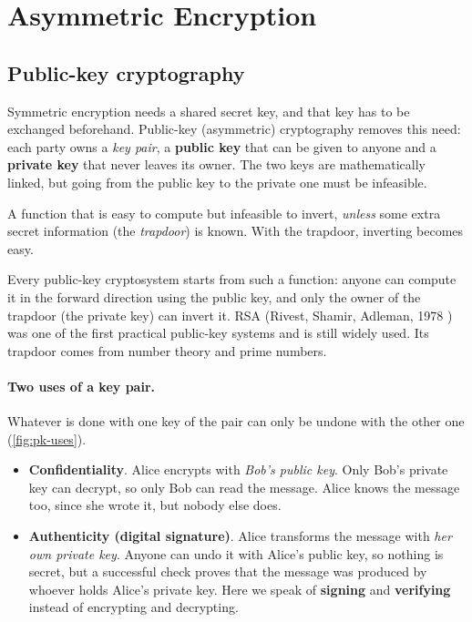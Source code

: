 \section{Asymmetric Encryption}
\label{sec:asymmetric}

\subsection{Public-key cryptography}

Symmetric encryption needs a shared secret key, and that key has to be exchanged beforehand. Public-key (asymmetric) cryptography removes this need: each party owns a \emph{key pair}, a \textbf{public key} that can be given to anyone and a \textbf{private key} that never leaves its owner. The two keys are mathematically linked, but going from the public key to the private one must be infeasible.

\begin{definition}
A function that is easy to compute but infeasible to invert, \emph{unless} some extra secret information (the \emph{trapdoor}) is known. With the trapdoor, inverting becomes easy.
\end{definition}

Every public-key cryptosystem starts from such a function: anyone can compute it in the forward direction using the public key, and only the owner of the trapdoor (the private key) can invert it. RSA (Rivest, Shamir, Adleman, 1978 \cite{rsa1978}) was one of the first practical public-key systems and is still widely used. Its trapdoor comes from number theory and prime numbers.

\paragraph{Two uses of a key pair.} Whatever is done with one key of the pair can only be undone with the other one (\cref{fig:pk-uses}).
\begin{itemize}
    \item \textbf{Confidentiality}. Alice encrypts with \emph{Bob's public key}. Only Bob's private key can decrypt, so only Bob can read the message. Alice knows the message too, since she wrote it, but nobody else does.
    \item \textbf{Authenticity (digital signature)}. Alice transforms the message with \emph{her own private key}. Anyone can undo it with Alice's public key, so nothing is secret, but a successful check proves that the message was produced by whoever holds Alice's private key. Here we speak of \textbf{signing} and \textbf{verifying} instead of encrypting and decrypting.
\end{itemize}

